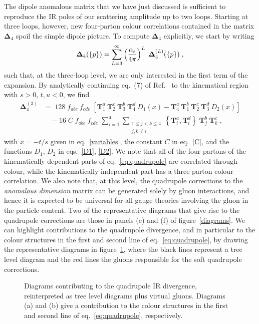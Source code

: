 The dipole anomalous matrix that we have just discussed is sufficient
to reproduce the IR poles of our scattering amplitude up to two
loops.  Starting at three loops, however, new four-parton colour
correlations contained in the matrix $\mathbf{\Delta}_4$ spoil the
simple dipole picture.  To compute $\mathbf{\Delta}_4$ explicitly,
we start by writing
\begin{equation}
\mathbf{\Delta}_4 (\{p\}) = \sum_{L=3}^\infty \left(\frac{\alpha_\mathrm{s}}{4 \pi}\right)^L \; \mathbf{\Delta}^{(L)}_4 (\{p\}) \; ,  \label{delta4_B}
\end{equation}
such that, at the three-loop level, we are only interested in the first term of the expansion.
%
By analytically continuing eq.~(7) of Ref.~\cite{Almelid:2015jia} to the kinematical region with $s>0$, $t,u < 0$,  we find
\begin{align} \label{eq:quadrupole}
\mathbf{\Delta}^{(3)}_4 &= \;  128 \; f_{abe} \: f_{cde} \;  \left[ \mathbf{T}^a_1\:\mathbf{T}^c_2\:\mathbf{T}^b_3\:\mathbf{T}^d_4\: D_1(x) - \mathbf{T}^a_4\:\mathbf{T}^b_1\:\mathbf{T}^c_2\:\mathbf{T}^d_3\: D_2(x) \right] \nonumber\\
&\quad - 16 \; C \; f_{abe} \: f_{cde}\;  \sum_{i=1}^4 \sum_{\substack{1\leq j < k \leq4 \\ j,k\neq i}}  \left\{ \mathbf{T}^a_i,\mathbf{T}^d_i \right\} \; \mathbf{T}^b_j \; \mathbf{T}^c_k \; ,
\end{align}
with $x=-t/s$ given in eq.~\eqref{variables}, the constant $C$ in eq.~\eqref{C}, and the functions $D_1$, $D_2$ in eqs.~\eqref{D1}, \eqref{D2}. We note that all of the four partons of the kinematically dependent parts of eq.~\eqref{eq:quadrupole} are correlated through colour, while the kinematically independent part has a three parton colour correlation.
We also note that, at this level, the quadrupole corrections to the {\it{anomalous dimension}} matrix can be generated solely by gluon interactions, and hence it is expected to be universal for all gauge theories involving the gluon in the particle content. Two of the representative diagrams that give rise to the quadrupole corrections are those in panels (e) and (f) of figure~\ref{diagrams}. 
We can highlight contributions to the quadrupole divergence, and in particular to the colour structures in the first and second line of eq.~\eqref{eq:quadrupole}, by drawing the representative diagrams in figure~\ref{diagrams_red},
where the black lines represent a tree level diagram and the red lines the gluons responsible for the soft quadrupole corrections.
%
\begin{figure}
\centering
{}\label{fig:2a}
\label{fig:2b}
\caption{Diagrams contributing to the quadrupole IR divergence, reinterpreted as tree level diagrams plus virtual gluons. Diagrams (a) and (b) give a contribution to the colour structures in the first and second line of eq.~\eqref{eq:quadrupole}, respectively.} \label{diagrams_red}
\end{figure}
